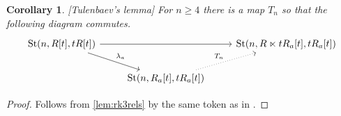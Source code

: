 \documentclass[oneside,12pt]{amsart}
\numberwithin{equation}{section}
\numberwithin{lem}{section}
\newtheorem{cor}[lem]{Corollary}
\theoremstyle{definition}
\theoremstyle{remark}
\newcommand{\Stb}{\mathrm{St}}
\begin{document}
\begin{appendices}
\begin{cor}\label{cor:tulmap}[Tulenbaev's lemma] For $n \geq 4$ there is a map $T_n$ so that the following diagram commutes.
\[\begin{tikzcd} \Stb(n, R[t], tR[t]) \arrow[rr] \arrow[dr, "\lambda_a"] & & \Stb(n, R\ltimes tR_a[t], tR_a[t]) \\
 & \Stb(n, R_a[t], tR_a[t]) \arrow[ur, dotted, "T_n"] & \end{tikzcd}\]
\end{cor}
\begin{proof} Follows from \cref{lem:rk3rels} by the same token as in \cite[Lemma~2.3]{Tu}. \end{proof}

\end{appendices}

\renewcommand{\refname}{References}
\end{document}
